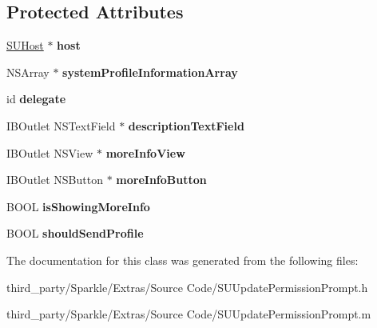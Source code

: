 \subsection*{Protected Attributes}
\begin{DoxyCompactItemize}
\item 
\mbox{\label{interface_s_u_update_permission_prompt_a05e76d90a32f8bb7586faea0574880b5}} 
\mbox{\hyperlink{interface_s_u_host}{S\+U\+Host}} $\ast$ {\bfseries host}
\item 
\mbox{\label{interface_s_u_update_permission_prompt_aa0fbbca5948e7d42e620bd764febb018}} 
N\+S\+Array $\ast$ {\bfseries system\+Profile\+Information\+Array}
\item 
\mbox{\label{interface_s_u_update_permission_prompt_a4154c461d545a14fff8ec415835d3b71}} 
id {\bfseries delegate}
\item 
\mbox{\label{interface_s_u_update_permission_prompt_adbad81a912450f238523f10d88573c96}} 
I\+B\+Outlet N\+S\+Text\+Field $\ast$ {\bfseries description\+Text\+Field}
\item 
\mbox{\label{interface_s_u_update_permission_prompt_a7f633272462f476d3e6121554f77628e}} 
I\+B\+Outlet N\+S\+View $\ast$ {\bfseries more\+Info\+View}
\item 
\mbox{\label{interface_s_u_update_permission_prompt_a353ff124b46b46915c177a2bb8f97434}} 
I\+B\+Outlet N\+S\+Button $\ast$ {\bfseries more\+Info\+Button}
\item 
\mbox{\label{interface_s_u_update_permission_prompt_a96760891f2f0e05f3c52f9a77570b495}} 
B\+O\+OL {\bfseries is\+Showing\+More\+Info}
\item 
\mbox{\label{interface_s_u_update_permission_prompt_aa01ac291b9acb1a7cc5bef4c1f7661c7}} 
B\+O\+OL {\bfseries should\+Send\+Profile}
\end{DoxyCompactItemize}


The documentation for this class was generated from the following files\+:\begin{DoxyCompactItemize}
\item 
third\+\_\+party/\+Sparkle/\+Extras/\+Source Code/S\+U\+Update\+Permission\+Prompt.\+h\item 
third\+\_\+party/\+Sparkle/\+Extras/\+Source Code/S\+U\+Update\+Permission\+Prompt.\+m\end{DoxyCompactItemize}
